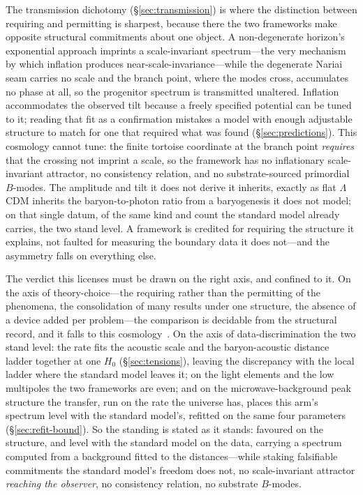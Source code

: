 \documentclass[11pt,a4paper]{article}
\theoremstyle{plain}
\theoremstyle{definition}
\theoremstyle{remark}
\begin{document}
The transmission dichotomy (\S\ref{sec:transmission}) is where the distinction between requiring and permitting is sharpest, because there the two frameworks make opposite structural commitments about one object. A non-degenerate horizon's exponential approach imprints a scale-invariant spectrum---the very mechanism by which inflation produces near-scale-invariance---while the degenerate Nariai seam carries no scale and the branch point, where the modes cross, accumulates no phase at all, so the progenitor spectrum is transmitted unaltered. Inflation accommodates the observed tilt because a freely specified potential can be tuned to it; reading that fit as a confirmation mistakes a model with enough adjustable structure to match for one that required what was found (\S\ref{sec:predictions}). This cosmology cannot tune: the finite tortoise coordinate at the branch point \emph{requires} that the crossing not imprint a scale, so the framework has no inflationary scale-invariant attractor, no consistency relation, and no substrate-sourced primordial $B$-modes. The amplitude and tilt it does not derive it inherits, exactly as flat $\Lambda$CDM inherits the baryon-to-photon ratio from a baryogenesis it does not model; on that single datum, of the same kind and count the standard model already carries, the two stand level. A framework is credited for requiring the structure it explains, not faulted for measuring the boundary data it does not---and the asymmetry falls on everything else.

The verdict this licenses must be drawn on the right axis, and confined to it. On the axis of theory-choice---the requiring rather than the permitting of the phenomena, the consolidation of many results under one structure, the absence of a device added per problem---the comparison is decidable from the structural record, and it falls to this cosmology~\cite{JanzenShadowExistence}. On the axis of data-discrimination the two stand level: the rate fits the acoustic scale and the baryon-acoustic distance ladder together at one $H_0$ (\S\ref{sec:tensions}), leaving the discrepancy with the local ladder where the standard model leaves it; on the light elements and the low multipoles the two frameworks are even; and on the microwave-background peak structure the transfer, run on the rate the universe has, places this arm's spectrum level with the standard model's, refitted on the same four parameters (\S\ref{sec:refit-bound}). So the standing is stated as it stands: favoured on the structure, and level with the standard model on the data, carrying a spectrum computed from a background fitted to the distances---while staking falsifiable commitments the standard model's freedom does not, no scale-invariant attractor \emph{reaching the observer}, no consistency relation, no substrate $B$-modes.
\end{document}
